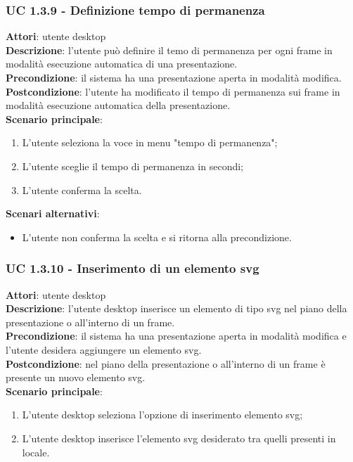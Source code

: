 \subsubsection{UC 1.3.9 - Definizione tempo di permanenza}{
	\label{uc1.3.9}
	\textbf{Attori}: utente desktop \\
	\textbf{Descrizione}: l'utente può definire il temo di permanenza per ogni frame in modalità esecuzione automatica di una presentazione. \\
	\textbf{Precondizione}: il sistema ha una presentazione aperta in modalità modifica.	\\
	\textbf{Postcondizione}: l'utente ha modificato il tempo di permanenza sui frame in modalità esecuzione automatica della presentazione.	\\
	\textbf{Scenario principale}:
	\begin{enumerate}
		\item L'utente seleziona la voce in menu "tempo di permanenza";
		\item L'utente sceglie il tempo di permanenza in secondi;
		\item L'utente conferma la scelta.
	\end{enumerate}
	\textbf{Scenari alternativi}:
	\begin{itemize}
		\item L'utente non conferma la scelta  e si ritorna alla precondizione.
	\end{itemize}
}
\subsubsection{UC 1.3.10 - Inserimento di un elemento svg}{
	\label{uc1.3.10}
	\textbf{Attori}: utente desktop \\
	\textbf{Descrizione}: l'utente desktop inserisce un elemento di tipo svg nel piano della presentazione o all'interno di un frame. \\
	\textbf{Precondizione}: il sistema ha una presentazione aperta in modalità modifica e l'utente desidera aggiungere un elemento svg.	\\
	\textbf{Postcondizione}: nel piano della presentazione o all'interno di un frame è presente un nuovo elemento svg.	\\
	\textbf{Scenario principale}:
	\begin{enumerate}
		\item L'utente desktop seleziona l'opzione di inserimento elemento svg;
		\item L'utente desktop inserisce l'elemento svg desiderato tra quelli presenti in locale.
	\end{enumerate}
	}
